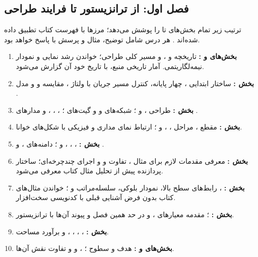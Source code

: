 \clearpage
\subsection*{فصل اول: از ترانزیستور تا فرایند طراحی}
ترتیب زیر تمام بخش‌های  تا  را پوشش می‌دهد؛ مرزها با فهرست کتاب تطبیق
داده شده‌اند \cite{weste}. هر درس شامل توضیح، مثال و پرسش با پاسخ خواهد بود.
\begin{enumerate}
\item \textbf{بخش‌های  و :} تاریخچه  و ،
 و مسیر کلی طراحی؛ خواندن رشد نمایی و نمودار نیمه‌لگاریتمی.
آمار تاریخی منبع، با تاریخ خود آن گزارش می‌شود.
\item \textbf{بخش :} ساختار ابتدایی ، چهار پایانه،
کنترل مسیر جریان با ولتاژ ، مقایسه  و  و مدل .
\item \textbf{بخش :} طراحی ،  و ؛
شبکه‌های  و  و گیت‌های ؛
، ، ،
 و مدارهای .
\item \textbf{بخش :} مقطع ، مراحل ،
،  و ؛
ارتباط نمای مداری و فیزیکی با شکل‌های خوانا.
\item \textbf{بخش :} ، ،
،  و ؛
دامنه‌های ،  و .
\item \textbf{بخش :} معرفی مقدمات لازم برای مثال ،
تفاوت  و  و اجرای چندچرخه‌ای؛
ساختار پردازنده پیش از تحلیل مثال کتاب معرفی می‌شود.
\item \textbf{بخش :} ، رابط‌های سطح بالا، نمودار بلوکی،
سلسله‌مراتب و ؛
خواندن مثال‌های کتاب بدون فرض آشنایی قبلی با کدنویسی سخت‌افزار.
\item \textbf{بخش :} ؛ مقدمه معیارهای
،  و  در حد همین فصل و پیوند آن‌ها با ترانزیستور.
\item \textbf{بخش :} ، ،
، ،  و برآورد مساحت.
\item \textbf{بخش‌های  و :} هدف و سطوح ؛
،  و  و تفاوت نقش آن‌ها.
\end{enumerate}


